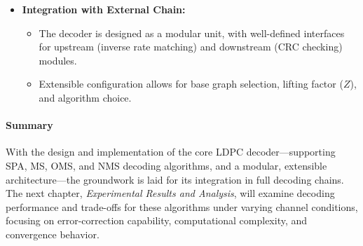 \documentclass[../main.tex]{subfiles}
\begin{document}
\begin{itemize}
\begin{itemize}
            \item Optional fixed-point (Q-format) support for hardware mapping.
            \item Min-Sum approximations and adjustable quantization improve stability and hardware efficiency.
            \item Clipping of extreme LLRs prevents numerical overflow and enhances reliability.
        \end{itemize}
    \item \textbf{Integration with External Chain:}
        \begin{itemize}
            \item The decoder is designed as a modular unit, with well-defined interfaces for upstream (inverse rate matching) and downstream (CRC checking) modules.
            \item Extensible configuration allows for base graph selection, lifting factor ($Z$), and algorithm choice.
        \end{itemize}
\end{itemize}


\paragraph{Summary}
With the design and implementation of the core LDPC decoder---supporting SPA, MS, OMS, and NMS decoding algorithms, and a modular, extensible architecture---the groundwork is laid for its integration in full decoding chains. The next chapter, \emph{Experimental Results and Analysis}, will examine decoding performance and trade-offs for these algorithms under varying channel conditions, focusing on error-correction capability, computational complexity, and convergence behavior.
\end{document}
